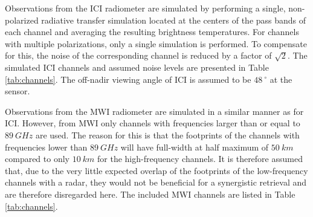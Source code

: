\documentclass[journal abbreviation, manuscript]{copernicus}
\begin{document}
Observations from the ICI radiometer are simulated by performing a single,
non-polarized radiative transfer simulation located at the centers of the pass
bands of each channel and averaging the resulting brightness temperatures. For
channels with multiple polarizations, only a single simulation is performed.
To compensate for this, the noise of the corresponding channel is reduced by a
factor of $\sqrt{2}$. The simulated ICI channels and assumed noise levels are
presented in  Table \ref{tab:channels}. The off-nadir viewing angle of ICI
is assumed to be $48\ \unit{^\circ}$ at the sensor.

Observations from the MWI radiometer are simulated in a similar manner as for
ICI. However, from MWI only channels with frequencies larger than or equal to
$89\ \unit{GHz}$ are used. The reason for this is that the footprints of the
channels with frequencies lower than $89\ \unit{GHz}$ will have full-width at
half maximum of $50\ \unit{km}$ compared to only $10\ \unit{km}$ for the
high-frequency channels. It is therefore assumed that, due to the very little
expected overlap of the footprints of the low-frequency channels with a radar,
they would not be beneficial for a synergistic retrieval and are therefore
disregarded here. The included MWI channels are listed in Table
\ref{tab:channels}.
\end{document}
